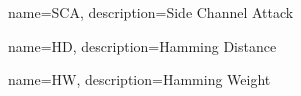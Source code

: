 {
	name=SCA,
	description={Side Channel Attack}
}

{
	name=HD,
	description={Hamming Distance}
}

{
	name=HW,
	description={Hamming Weight}
}